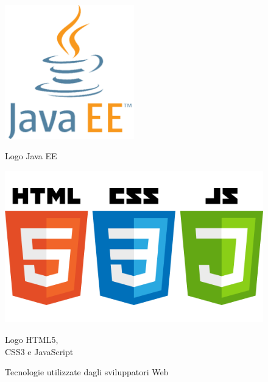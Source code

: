 \begin{figure}[htbp]
\centering
\begin{minipage}[c]{.40\textwidth}
\centering\setlength{\captionmargin}{0pt}%
\includegraphics[width=0.5\textwidth]{immagini/JavaEE}
\caption{Logo Java EE}
\end{minipage}%
\begin{minipage}[c]{.40\textwidth}
\centering\setlength{\captionmargin}{0pt}%
\includegraphics[width=1\textwidth]{immagini/HTML5_CSS_JavaScript}
\caption{Logo HTML5,\\CSS3 e JavaScript}
\end{minipage}
\caption{Tecnologie utilizzate dagli sviluppatori Web}
\end{figure}


			
